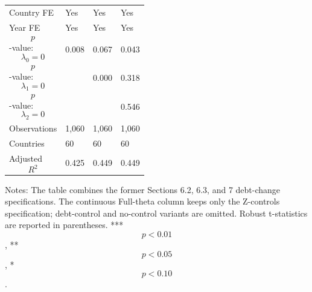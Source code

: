 \begin{table}[H]
\begin{threeparttable}
\begin{tabularx}{\textwidth}{lYYY}
Country FE & Yes & Yes & Yes \\
Year FE & Yes & Yes & Yes \\
$$p$$-value: $$\lambda_0=0$$ & 0.008 & 0.067 & 0.043 \\
$$p$$-value: $$\lambda_1=0$$ &  & 0.000 & 0.318 \\
$$p$$-value: $$\lambda_2=0$$ &  &  & 0.546 \\
Observations & 1,060 & 1,060 & 1,060 \\
Countries & 60 & 60 & 60 \\
Adjusted $$R^2$$ & 0.425 & 0.449 & 0.449 \\
\bottomrule
\end{tabularx}
\begin{tablenotes}[flushleft]\footnotesize
\item Notes: The table combines the former Sections 6.2, 6.3, and 7 debt-change specifications. The continuous Full-theta column keeps only the Z-controls specification; debt-control and no-control variants are omitted. Robust t-statistics are reported in parentheses. *** $$p<0.01$$, ** $$p<0.05$$, * $$p<0.10$$.
\end{tablenotes}
\end{threeparttable}
\end{table}
